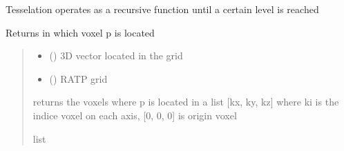 \documentclass[letterpaper,10pt,english]{sphinxmanual}
\begin{document}
\sphinxAtStartPar
Tesselation operates as a recursive function until a certain level is reached

\begin{fulllineitems}
\label{\detokenize{reference:tesselator.whichvoxel}}
\pysigstartsignatures
{}
\pysigstopsignatures
\sphinxAtStartPar
Returns in which voxel p is located
\begin{quote}\begin{description}
\begin{itemize}
\item {} 
\sphinxAtStartPar
{} () \textendash{} 3D vector located in the grid

\item {} 
\sphinxAtStartPar
{} () \textendash{} RATP grid

\end{itemize}

\sphinxAtStartPar
returns the voxels where p is located in a list {[}kx, ky, kz{]} where ki is the indice
voxel on each axis, {[}0, 0, 0{]} is origin voxel

\sphinxAtStartPar
list

\end{description}\end{quote}

\end{fulllineitems}

\end{document}
